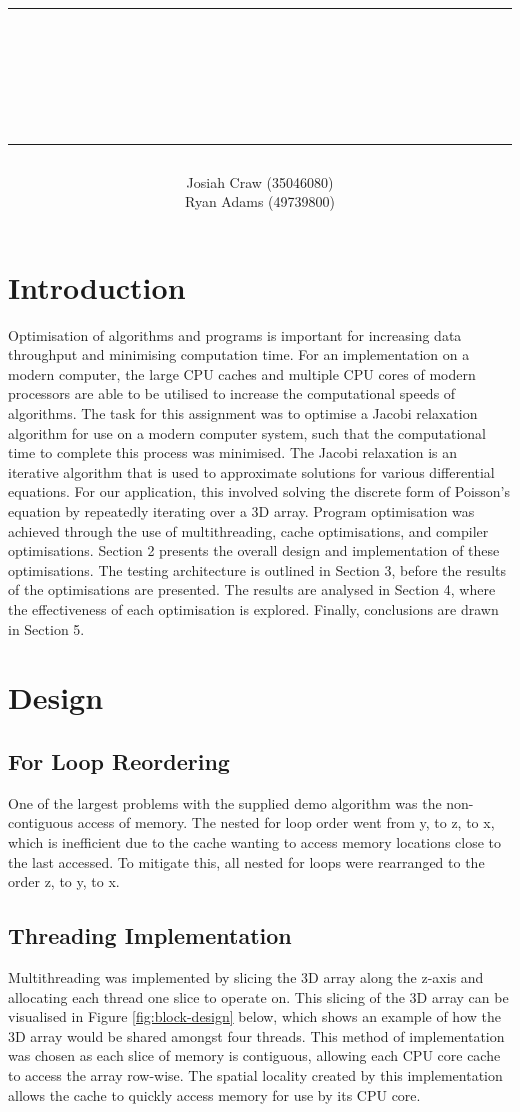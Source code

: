 \documentclass[12pt]{article}
\author{\LARGE Josiah Craw (35046080)\vspace{1cm}\\\LARGE Ryan Adams (49739800)\vspace{1cm}\\}
\title{\rule{\textwidth}{0.8pt} \\ {\huge \textbf{\reportTitle}}\\{\large \subTitle} \rule{\textwidth}{0.8pt}}
\begin{document}
\maketitle
\thispagestyle{empty}
\newpage

\setcounter{page}{1}
\section{Introduction}
Optimisation of algorithms and programs is important for increasing data throughput and
minimising computation time. For an implementation on a modern computer, the large CPU caches and multiple CPU cores
of modern processors are able to be utilised to increase the computational speeds of algorithms. The task for this
assignment was to optimise a Jacobi relaxation algorithm for use on a modern computer system, such that the
computational time to complete this process was minimised. The Jacobi relaxation is an iterative algorithm that 
is used to approximate solutions for various differential equations. For our application, this involved solving the 
discrete form of Poisson’s equation by repeatedly iterating over a 3D array. Program optimisation was achieved through 
the use of multithreading, cache optimisations, and compiler optimisations. Section 2 presents the overall design and 
implementation of these optimisations. The testing architecture is outlined in Section 3, before the results of the 
optimisations are presented. The results are analysed in Section 4, where the effectiveness of each optimisation is 
explored. Finally, conclusions are drawn in Section 5.

\section{Design}

\subsection{For Loop Reordering}
One of the largest problems with the supplied demo algorithm was the non-contiguous access of memory. The nested for
loop order went from y, to z, to x, which is inefficient due to the cache wanting to access memory locations close to
the last accessed. To mitigate this, all nested for loops were rearranged to the order z, to y, to x.

\subsection{Threading Implementation}
Multithreading was implemented by slicing the 3D array along the z-axis and allocating each thread one slice to operate on.
This slicing of the 3D array can be visualised in Figure \ref{fig:block-design} below, which shows an example of how the 3D array
would be shared amongst four threads. This method of implementation was chosen as each slice of memory is contiguous,
allowing each CPU core cache to access the array row-wise. The spatial locality created by this implementation allows
the cache to quickly access memory for use by its CPU core.
\end{document}
